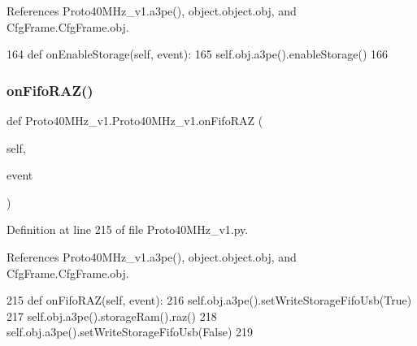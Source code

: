 References Proto40\+M\+Hz\+\_\+v1.\+a3pe(), object.\+object.\+obj, and Cfg\+Frame.\+Cfg\+Frame.\+obj.


\begin{DoxyCode}
164     \textcolor{keyword}{def }onEnableStorage(self, event):
165         self.obj.a3pe().enableStorage()
166 
\end{DoxyCode}
\mbox{\label{classProto40MHz__v1_1_1Proto40MHz__v1_af298324a50fcbaab3114aa2b9cc52b81}} 
\subsubsection{\texorpdfstring{on\+Fifo\+R\+A\+Z()}{onFifoRAZ()}}
{\footnotesize\ttfamily def Proto40\+M\+Hz\+\_\+v1.\+Proto40\+M\+Hz\+\_\+v1.\+on\+Fifo\+R\+AZ (\begin{DoxyParamCaption}\item[{}]{self,  }\item[{}]{event }\end{DoxyParamCaption})}



Definition at line 215 of file Proto40\+M\+Hz\+\_\+v1.\+py.



References Proto40\+M\+Hz\+\_\+v1.\+a3pe(), object.\+object.\+obj, and Cfg\+Frame.\+Cfg\+Frame.\+obj.


\begin{DoxyCode}
215     \textcolor{keyword}{def }onFifoRAZ(self, event):
216         self.obj.a3pe().setWriteStorageFifoUsb(\textcolor{keyword}{True})        
217         self.obj.a3pe().storageRam().raz()
218         self.obj.a3pe().setWriteStorageFifoUsb(\textcolor{keyword}{False})
219 
\end{DoxyCode}
\mbox{\label{classProto40MHz__v1_1_1Proto40MHz__v1_ab13eebd15de4b16c9abf12d07dbda156}} 
